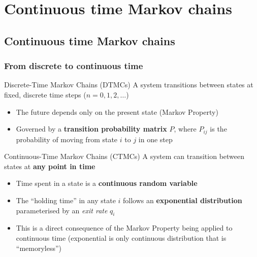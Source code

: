 \documentclass[aspectratio=169]{beamer}\usepackage[]{graphicx}\usepackage[]{xcolor}
\begin{document}
\section{Continuous time Markov chains}

\subsection{Continuous time Markov chains}
\begin{frame}
    \frametitle{From discrete to continuous time}
    \begin{block}{Discrete-Time Markov Chains (DTMCs)}
        A system transitions between states at fixed, discrete time steps ($n=0, 1, 2, \dots$)
        \begin{itemize}
            \item The future depends only on the present state (Markov Property)
            \item Governed by a \textbf{transition probability matrix} $P$, where $P_{ij}$ is the probability of moving from state $i$ to $j$ in one step
        \end{itemize}
    \end{block}
    
    \begin{block}{Continuous-Time Markov Chains (CTMCs)}
        A system can transition between states at \textbf{any point in time}
        \begin{itemize}
            \item Time spent in a state is a \textbf{continuous random variable}
            \item The ``holding time'' in any state $i$ follows an \textbf{exponential distribution} parameterised by an \textit{exit rate} $q_i$
            \item This is a direct consequence of the Markov Property being applied to continuous time (exponential is only continuous distribution that is ``memoryless'')
        \end{itemize}
    \end{block}
\end{frame}
\end{document}
